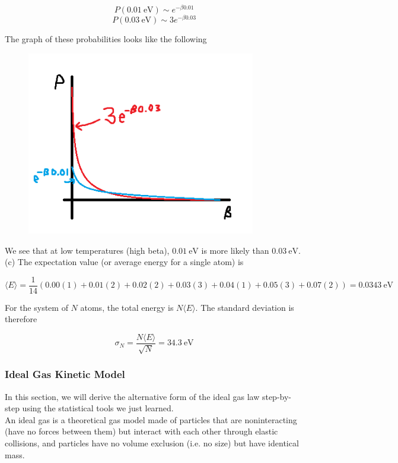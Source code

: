 \documentclass[12pt, a4paper]{article}
\newcounter{exa}
\begin{document}
\begin{texample}
\[ P(\SI{0.01}{\electronvolt}) \sim e^{-\beta 0.01} \]
\[ P(\SI{0.03}{\electronvolt}) \sim 3e^{-\beta 0.03} \]

The graph of these probabilities looks like the following

\begin{figure}[H]
\centering
\includegraphics[width=100mm]{29.png}
\end{figure}

We see that at low temperatures (high beta), $\SI{0.01}{\electronvolt}$ is more likely than $\SI{0.03}{\electronvolt}$. \\

(c) The expectation value (or average energy for a single atom) is

\[ \langle E \rangle=\frac{1}{14} \left( 0.00 (1) + 0.01 (2) + 0.02 (2) + 0.03 (3) + 0.04 (1) + 0.05 (3) + 0.07 (2) \right) = \SI{0.0343}{\electronvolt} \]

For the system of $N$ atoms, the total energy is $N\langle E \rangle$. The standard deviation is therefore

\[ \sigma_N = \frac{N\langle E \rangle}{\sqrt{N}}=\SI{34.3}{\electronvolt} \]

\end{texample}

\subsubsection{Ideal Gas Kinetic Model}

In this section, we will derive the alternative form of the ideal gas law step-by-step using the statistical tools we just learned. \\

An ideal gas is a theoretical gas model made of particles that are noninteracting (have no forces between them) but interact with each other through elastic collisions, and particles have no volume exclusion (i.e. no size) but have identical mass. \\
\end{document}
